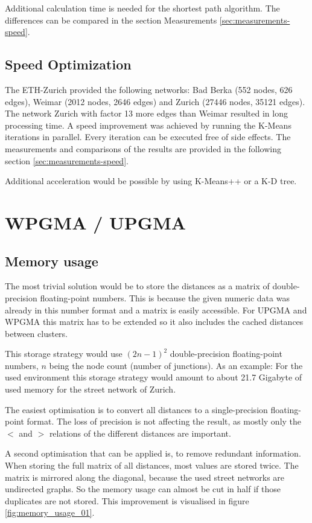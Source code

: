 Additional calculation time is needed for the shortest path algorithm. The differences can be compared in the section Measurements \ref{sec:measurements-speed}.

\subsection{Speed Optimization}
The ETH-Zurich provided the following networks: Bad Berka (552 nodes, 626 edges), Weimar (2012 nodes, 2646 edges) and Zurich (27446 nodes, 35121 edges). The network Zurich with factor 13 more edges than Weimar resulted in long processing time. A speed improvement was achieved by running the K-Means iterations in parallel. Every iteration can be executed free of side effects. The measurements and comparisons of the results are provided in the following section \ref{sec:measurements-speed}.

Additional acceleration would be possible by using K-Means++ or a K-D tree.

\pagebreak
\section{WPGMA / UPGMA}
\subsection{Memory usage} \label{sec:memory_usage}
The most trivial solution would be to store the distances as a matrix of double-precision floating-point numbers. This is because the given numeric data was already in this number format and a matrix is easily accessible. For \acrshort{UPGMA} and \acrshort{WPGMA} this matrix has to be extended so it also includes the cached distances between clusters.

This storage strategy would use $(2n-1)^2$ double-precision floating-point numbers, $n$ being the node count (number of junctions). As an example: For the used environment this storage strategy would amount to about 21.7 Gigabyte of used memory for the street network of Zurich.

The easiest optimisation is to convert all distances to a single-precision floating-point format. The loss of precision is not affecting the result, as mostly only the $<$ and $>$ relations of the different distances are important.

A second optimisation that can be applied is, to remove redundant information. When storing the full matrix of all distances, most values are stored twice. The matrix is mirrored along the diagonal, because the used street networks are undirected graphs. So the memory usage can almost be cut in half if those duplicates are not stored. This improvement is visualised in figure \ref{fig:memory_usage_01}.

